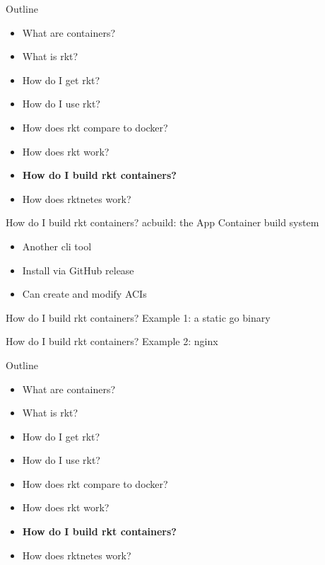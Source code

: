 \documentclass[pdf,aspectratio=169]{beamer}
\begin{document}
\begin{frame}
    Outline
    \begin{itemize}
        \item What are containers?
        \item What is rkt?
        \item How do I get rkt?
        \item How do I use rkt?
        \item How does rkt compare to docker?
        \item How does rkt work?
        \item \textbf{How do I build rkt containers?}
        \item How does rktnetes work?
    \end{itemize}
\end{frame}

\begin{frame}{How do I build rkt containers?}
    acbuild: the App Container build system
    \begin{itemize}
        \pause
        \item Another cli tool
        \pause
        \item Install via GitHub release
        \pause
        \item Can create and modify ACIs
    \end{itemize}
\end{frame}

\begin{frame}{How do I build rkt containers?}
    Example 1: a static go binary
\end{frame}

\begin{frame}{How do I build rkt containers?}
    Example 2: nginx
\end{frame}

\begin{frame}
    Outline
    \begin{itemize}
        \item What are containers?
        \item What is rkt?
        \item How do I get rkt?
        \item How do I use rkt?
        \item How does rkt compare to docker?
        \item How does rkt work?
        \item \textbf{How do I build rkt containers?}
        \item How does rktnetes work?
    \end{itemize}
\end{frame}
\end{document}
